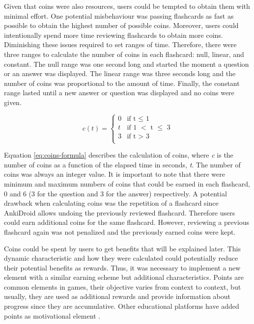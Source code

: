 Given that coins were also resources, users could be tempted to obtain them with minimal effort. One potential misbehaviour was passing flashcards as fast as possible to obtain the highest number of possible coins. Moreover, users could intentionally spend more time reviewing flashcards to obtain more coins. Diminishing these issues required to set ranges of time. Therefore, there were three ranges to calculate the number of coins in each flashcard: null, linear, and constant. The null range was one second long and started the moment a question or an answer was displayed. The linear range was three seconds long and the number of coins was proportional to the amount of time. Finally, the constant range lasted until a new answer or question was displayed and no coins were given.

\begin{equation}
  c(t) =
      \begin{cases}
        0 & \text{if t $\leq$ 1}\\
        t & \text{if 1 $<$ t $\leq$ 3}\\
        3 & \text{if t $>$ 3}\\
      \end{cases}
    \label{eq:coins-formula}
\end{equation}

Equation \ref{eq:coins-formula} describes the calculation of coins, where \textit{c} is the number of coins as a function of the elapsed time in seconds, \textit{t}. The number of coins was always an integer value. It is important to note that there were minimum and maximum numbers of coins that could be earned in each flashcard, 0 and 6 (3 for the question and 3 for the answer) respectively. A potential drawback when calculating coins was the repetition of a flashcard since AnkiDroid allows undoing the previously reviewed flashcard. Therefore users could earn additional coins for the same flashcard. However, reviewing a previous flashcard again was not penalized and the previously earned coins were kept.

Coins could be spent by users to get benefits that will be explained later. This dynamic characteristic and how they were calculated could potentially reduce their potential benefits as rewards. Thus, it was necessary to implement a new element with a similar earning scheme but additional characteristics. Points are common elements in games, their objective varies from context to context, but usually, they are used as additional rewards and provide information about progress since they are accumulative. Other educational platforms have added points as motivational element \citep{disalvo2014khan}.

